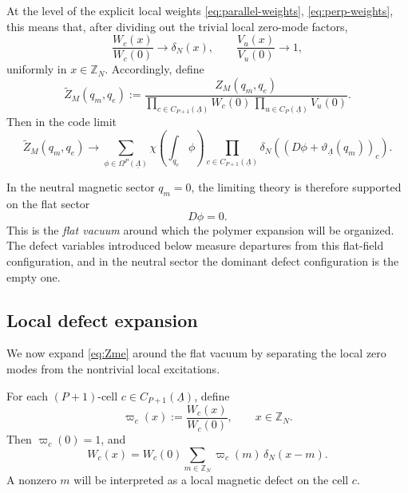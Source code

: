 At the level of the explicit local weights \eqref{eq:parallel-weights}, \eqref{eq:perp-weights},
this means that, after dividing out the trivial local zero-mode factors,
\begin{equation}
	\frac{W_c(x)}{W_c(0)}\rightarrow \delta_N(x),
	\qquad
	\frac{V_u(x)}{V_u(0)}\rightarrow 1,
	\label{eq:codeLimitWV}
\end{equation}
uniformly in \(x\in\mathbb Z_N\). Accordingly, define
\begin{equation}
	\widetilde Z_M(q_m,q_e)
	:=
	\frac{Z_M(q_m,q_e)}
	{\prod_{c\in C_{P+1}(\underline\Lambda)}W_c(0)\,
		\prod_{u\in C_P(\underline\Lambda)}V_u(0)}.
	\label{eq:ZmeNormal}
\end{equation}
Then in the code limit
\begin{equation}
	\widetilde Z_M(q_m,q_e)
	\rightarrow
	\sum_{\phi\in \Omega^P(\underline\Lambda)}
	\chi \left(\int_{q_e}\phi\right)
	\prod_{c\in C_{P+1}(\underline\Lambda)}
	\delta_N \left((D\phi+\vartheta_{\underline\Lambda}(q_m))_c\right).
	\label{eq:codeLimitZme}
\end{equation}

In the neutral magnetic sector \(q_m=0\), the limiting theory is therefore supported on the
flat sector
\begin{equation}
	D\phi=0.
\end{equation}
This is the \emph{flat vacuum} around which the polymer expansion will be organized. The defect variables
introduced below measure departures from this flat-field configuration, and in the neutral
sector the dominant defect configuration is the empty one.

\subsection{Local defect expansion}

We now expand \eqref{eq:Zme} around the flat vacuum by separating the
local zero modes from the nontrivial local excitations.

For each \((P+1)\)-cell \(c\in C_{P+1}(\underline\Lambda)\), define
\begin{equation}
	\varpi_c(x)
	:=
	\frac{W_c(x)}{W_c(0)},
	\qquad
	x\in \mathbb Z_N.
	\label{eq:magnetic-local-amplitude}
\end{equation}
Then \(\varpi_c(0)=1\), and
\begin{equation}
	W_c(x)
	=
	W_c(0)\sum_{m\in \mathbb Z_N}\varpi_c(m)\,\delta_N(x-m).
	\label{eq:W-cell-expansion}
\end{equation}
A nonzero \(m\) will be interpreted as a local magnetic defect on the cell \(c\).

